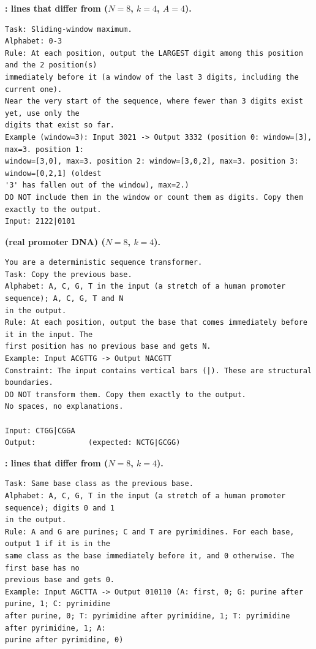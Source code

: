 \par\medskip\noindent\textbf{: lines that differ from  ($N = 8$, $k = 4$, $A = 4$).}\par
\begin{small}
\begin{verbatim}
Task: Sliding-window maximum.
Alphabet: 0-3
Rule: At each position, output the LARGEST digit among this position and the 2 position(s)
immediately before it (a window of the last 3 digits, including the current one).
Near the very start of the sequence, where fewer than 3 digits exist yet, use only the
digits that exist so far.
Example (window=3): Input 3021 -> Output 3332 (position 0: window=[3], max=3. position 1:
window=[3,0], max=3. position 2: window=[3,0,2], max=3. position 3: window=[0,2,1] (oldest
'3' has fallen out of the window), max=2.)
DO NOT include them in the window or count them as digits. Copy them exactly to the output.
Input: 2122|0101
\end{verbatim}
\end{small}

\par\medskip\noindent\textbf{ (real promoter DNA) ($N = 8$, $k = 4$).}\par
\begin{small}
\begin{verbatim}
You are a deterministic sequence transformer.
Task: Copy the previous base.
Alphabet: A, C, G, T in the input (a stretch of a human promoter sequence); A, C, G, T and N
in the output.
Rule: At each position, output the base that comes immediately before it in the input. The
first position has no previous base and gets N.
Example: Input ACGTTG -> Output NACGTT
Constraint: The input contains vertical bars (|). These are structural boundaries.
DO NOT transform them. Copy them exactly to the output.
No spaces, no explanations.

Input: CTGG|CGGA
Output:            (expected: NCTG|GCGG)
\end{verbatim}
\end{small}

\par\medskip\noindent\textbf{: lines that differ from  ($N = 8$, $k = 4$).}\par
\begin{small}
\begin{verbatim}
Task: Same base class as the previous base.
Alphabet: A, C, G, T in the input (a stretch of a human promoter sequence); digits 0 and 1
in the output.
Rule: A and G are purines; C and T are pyrimidines. For each base, output 1 if it is in the
same class as the base immediately before it, and 0 otherwise. The first base has no
previous base and gets 0.
Example: Input AGCTTA -> Output 010110 (A: first, 0; G: purine after purine, 1; C: pyrimidine
after purine, 0; T: pyrimidine after pyrimidine, 1; T: pyrimidine after pyrimidine, 1; A:
purine after pyrimidine, 0)
\end{verbatim}
\end{small}

